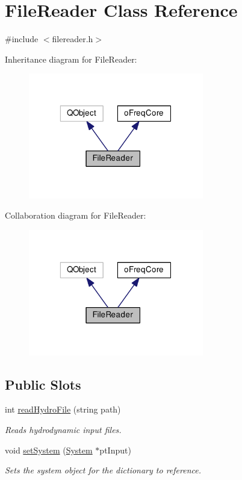 \hypertarget{class_file_reader}{\section{File\-Reader Class Reference}
\label{class_file_reader}
}


{\ttfamily \#include $<$filereader.\-h$>$}



Inheritance diagram for File\-Reader\-:
\nopagebreak
\begin{figure}[H]
\begin{center}
\leavevmode
\includegraphics[width=217pt]{class_file_reader__inherit__graph}
\end{center}
\end{figure}


Collaboration diagram for File\-Reader\-:
\nopagebreak
\begin{figure}[H]
\begin{center}
\leavevmode
\includegraphics[width=217pt]{class_file_reader__coll__graph}
\end{center}
\end{figure}
\subsection*{Public Slots}
\begin{DoxyCompactItemize}
\item 
int \hyperlink{class_file_reader_af2a8096f301a0fcf86497726c939515c}{read\-Hydro\-File} (string path)
\begin{DoxyCompactList}\small\item\em Reads hydrodynamic input files. \end{DoxyCompactList}\item 
void \hyperlink{class_file_reader_a0f14a8038fdac70d032c1708463eef2c}{set\-System} (\hyperlink{class_system}{System} $\ast$pt\-Input)
\begin{DoxyCompactList}\small\item\em Sets the system object for the dictionary to reference. \end{DoxyCompactList}\end{DoxyCompactItemize}
